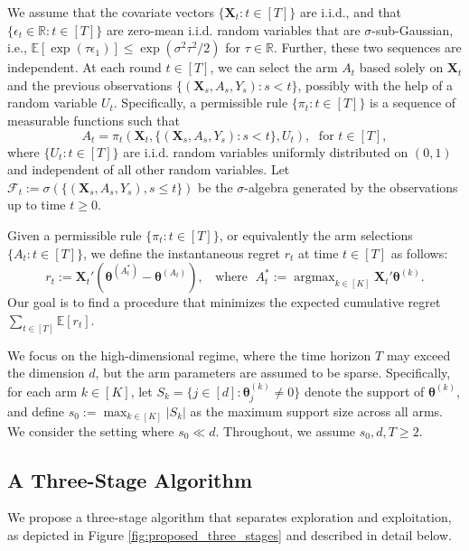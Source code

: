 \documentclass[aos,preprint]{imsart}
\theoremstyle{plain}
\theoremstyle{definition}
\newcommand{\btheta}{\boldsymbol{\theta}}
\newcommand{\bX}{\boldsymbol{X}}
\DeclareMathOperator*{\argmax}{argmax}
\newcommand{\cF}{\mathcal{F}}
\newcommand{\Exp}{\mathbb{E}}
\begin{document}
We assume that the covariate vectors $\{\bX_t : t \in [T]\}$ are i.i.d., and that $\{\epsilon_t \in \mathbb{R} : t \in [T]\}$ are zero-mean i.i.d. random variables that are $\sigma$-sub-Gaussian, i.e., $\Exp[\exp(\tau \epsilon_1)] \leq \exp(\sigma^2 \tau^2 / 2)$ for $\tau \in \mathbb{R}$. Further, these two sequences are independent. At each round $t \in [T]$, we can select the arm $A_t$ based solely on $\bX_t$ and the previous observations $\{ (\bX_s, A_s, Y_s) : s < t \}$, possibly with the help of a random variable $U_t$.  Specifically, a permissible rule $\{\pi_t : t \in [T]\}$ is a sequence of measurable functions such that 
$$ 
A_t = \pi_t\left( \bX_t, \{(\bX_s, A_s, Y_s) : s < t\}, U_t \right),\; \text{ for } t \in [T],
$$
where $\{U_t : t \in [T]\}$ are i.i.d. random variables uniformly distributed on $(0,1)$ and independent of all other random variables. Let $\cF_t := \sigma(\{(\bX_s, A_s, Y_s), s\le t\})$ be the $\sigma$-algebra generated by the observations up to time $t \geq 0$. 


Given a permissible rule $\{\pi_t : t \in [T]\}$, or equivalently the arm selections $\{A_t : t \in [T]\}$, we define the instantaneous regret $r_t$ at time $t \in [T]$ as follows:
\begin{equation}
    \label{eq: def of regret}
    r_t := \bX_{t}'\left(\btheta^{(A_t^*)} - \btheta^{(A_t)} \right), \;\; \text{ where } \;A_t^*:= \argmax_{k \in [K]} \bX_t'\btheta^{(k)}.
\end{equation}
Our goal is to find a procedure that minimizes the expected cumulative regret $\sum_{t \in [T]} \Exp[r_t]$.

We focus on the high-dimensional regime, where the time horizon $T$ may exceed the dimension $d$, but the arm parameters are assumed to be sparse. Specifically, for each arm $k \in [K]$, let $S_k = \{ j \in [d] : \btheta^{(k)}_j \neq 0 \}$ denote the support of $\btheta^{(k)}$, and define $s_0 := \max_{k \in [K]} |S_k|$ as the maximum support size across all arms. We consider the setting where $s_0 \ll d$. Throughout, we assume $s_0,d, T \geq 2$.


  


 
\subsection{A Three-Stage Algorithm} \label{subsec:three_stage_algo}
We propose a three-stage algorithm that separates exploration and exploitation, as depicted in Figure \ref{fig:proposed_three_stages} and described in detail below. 
\end{document}
